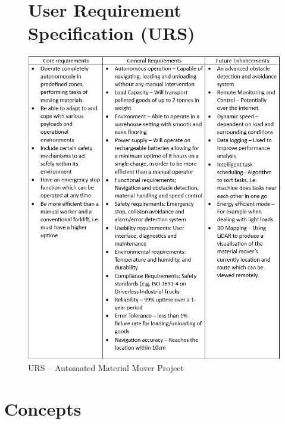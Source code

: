 \documentclass[12pt]{article}
\begin{document}
\FloatBarrier




\begin{figure}[ht]
 
\section{User Requirement Specification (URS)}
    \centering
     \includegraphics[width=1.05\textwidth]{URS.png}
     \caption{URS – Automated Material Mover Project}
    \label{fig:URS}
\end{figure}
\FloatBarrier

\newpage
\section{Concepts}
\end{document}
